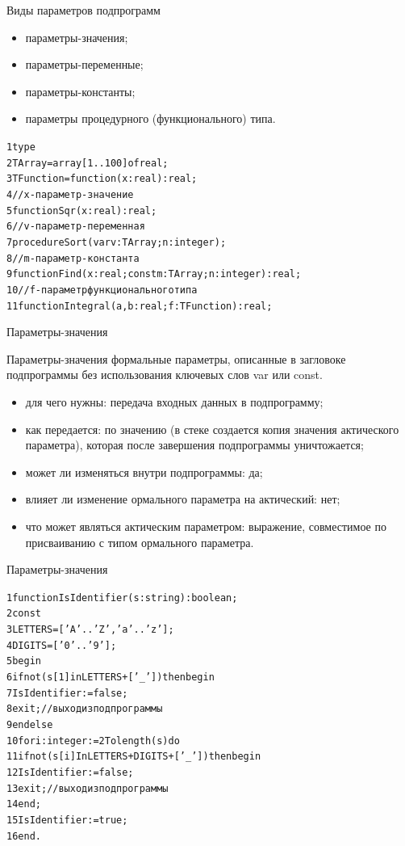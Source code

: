 \documentclass{beamer}
\begin{document}
\begin{frame}[fragile]{Виды параметров подпрограмм}
\begin{itemize}
\item параметры-значения;
\item параметры-переменные;
\item параметры-константы;
\item параметры процедурного (функционального) типа.
\end{itemize}
\begin{alltt}
1 type
2   TArray = array[1..100] of real;
3   TFunction = function(x: real):real; 
4  //x - параметр-значение
5 function Sqr(x: real): real;
6  //v - параметр-переменная
7 procedure Sort(var v: TArray; n: integer);
8  //m - параметр-константа
9 function Find(x: real; const m: TArray; n: integer): real;
10 //f - параметр функционального типа
11 function Integral(a, b: real; f: TFunction): real;
\end{alltt}
\end{frame}

\begin{frame}[fragile]{Параметры-значения}
\begin{block}{Параметры-значения }
формальные параметры, описанные в загловоке подпрограммы без использования ключевых слов var или const.
\end{block}
\begin{itemize}
\item для чего нужны: передача входных данных в подпрограмму;
\item как передается: по значению (в стеке создается копия значения актического параметра), которая после завершения подпрограммы уничтожается;
\item может ли изменяться внутри подпрограммы: да;
\item влияет ли изменение ормального параметра на актический: нет;
\item что может являться актическим параметром: выражение, совместимое по присваиванию с типом ормального параметра.
\end{itemize}
\end{frame}

\begin{frame}[fragile]{Параметры-значения}
\begin{alltt}
1 function IsIdentifier(s: string): boolean;
2 const 
3   LETTERS = ['A'..'Z', 'a'..'z'];
4   DIGITS = ['0'..'9'];
5 begin
6   if not (s[1] in LETTERS + ['_']) then begin
7     IsIdentifier := false;
8     exit; //выход из подпрограммы
9   end else	
10   for i: integer := 2 To length(s) do
11     if not (s[i] In LETTERS + DIGITS + ['_']) then begin
12        IsIdentifier := false;
13        exit; //выход из подпрограммы
14     end;
15   IsIdentifier := true;
16 end.
\end{alltt}
\end{frame}
\end{document}
